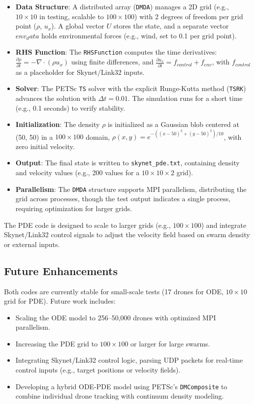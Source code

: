 \documentclass{article}
\theoremstyle{plain}
\begin{document}
\begin{itemize}
    \item \textbf{Data Structure}: A distributed array (\texttt{DMDA}) manages a 2D grid (e.g., $10 \times 10$ in testing, scalable to $100 \times 100$) with 2 degrees of freedom per grid point ($\rho$, $u_x$). A global vector $U$ stores the state, and a separate vector $env_data$ holds environmental forces (e.g., wind, set to 0.1 per grid point).
    \item \textbf{RHS Function}: The \texttt{RHSFunction} computes the time derivatives: $\frac{\partial \rho}{\partial t} = -\nabla \cdot (\rho u_x)$ using finite differences, and $\frac{\partial u_x}{\partial t} = f_{control} + f_{env}$, with $f_{control}$ as a placeholder for Skynet/Link32 inputs.
    \item \textbf{Solver}: The PETSc \texttt{TS} solver with the explicit Runge-Kutta method (\texttt{TSRK}) advances the solution with $\Delta t = 0.01$. The simulation runs for a short time (e.g., 0.1 seconds) to verify stability.
    \item \textbf{Initialization}: The density $\rho$ is initialized as a Gaussian blob centered at (50, 50) in a $100 \times 100$ domain, $\rho(x, y) = e^{-((x-50)^2 + (y-50)^2)/10}$, with zero initial velocity.
    \item \textbf{Output}: The final state is written to \texttt{skynet\_pde.txt}, containing density and velocity values (e.g., 200 values for a $10 \times 10 \times 2$ grid).
    \item \textbf{Parallelism}: The \texttt{DMDA} structure supports MPI parallelism, distributing the grid across processes, though the test output indicates a single process, requiring optimization for larger grids.
\end{itemize}

The PDE code is designed to scale to larger grids (e.g., $100 \times 100$) and integrate Skynet/Link32 control signals to adjust the velocity field based on swarm density or external inputs.

\subsection{Future Enhancements}
Both codes are currently stable for small-scale tests (17 drones for ODE, $10 \times 10$ grid for PDE). Future work includes:
\begin{itemize}
    \item Scaling the ODE model to 256--50,000 drones with optimized MPI parallelism.
    \item Increasing the PDE grid to $100 \times 100$ or larger for large swarms.
    \item Integrating Skynet/Link32 control logic, parsing UDP packets for real-time control inputs (e.g., target positions or velocity fields).
    \item Developing a hybrid ODE-PDE model using PETSc's \texttt{DMComposite} to combine individual drone tracking with continuum density modeling.
\end{itemize}
\end{document}
